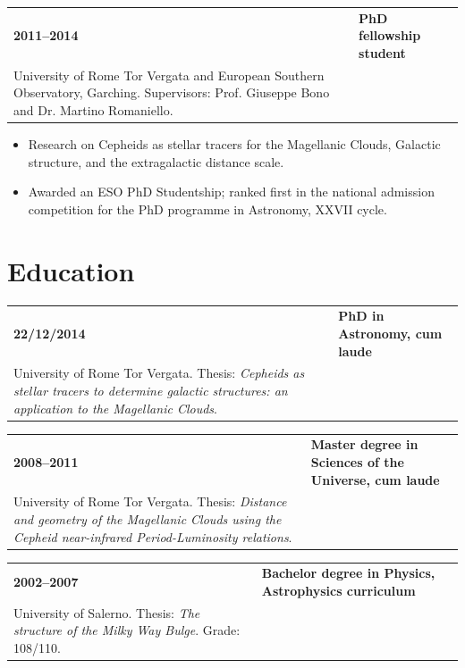 \documentclass[11pt,a4paper]{article}
\makeatletter
\newcommand{\cvitem}[2]{\begin{tabularx}{\textwidth}{@{}p{3.1cm}X@{}}\textbf{#1} & #2 \\ \end{tabularx}}
\newcommand{\role}[3]{\cvitem{#1}{\textbf{#2}\\#3}}
\makeatother
\begin{document}
\role{2011--2014}{PhD fellowship student}{University of Rome Tor Vergata and European Southern Observatory, Garching. Supervisors: Prof. Giuseppe Bono and Dr. Martino Romaniello.}
\begin{itemize}
    \item Research on Cepheids as stellar tracers for the Magellanic Clouds, Galactic structure, and the extragalactic distance scale.
    \item Awarded an ESO PhD Studentship; ranked first in the national admission competition for the PhD programme in Astronomy, XXVII cycle.
\end{itemize}

\section*{Education}
\role{22/12/2014}{PhD in Astronomy, cum laude}{University of Rome Tor Vergata. Thesis: \textit{Cepheids as stellar tracers to determine galactic structures: an application to the Magellanic Clouds}.}
\role{2008--2011}{Master degree in Sciences of the Universe, cum laude}{University of Rome Tor Vergata. Thesis: \textit{Distance and geometry of the Magellanic Clouds using the Cepheid near-infrared Period-Luminosity relations}.}
\role{2002--2007}{Bachelor degree in Physics, Astrophysics curriculum}{University of Salerno. Thesis: \textit{The structure of the Milky Way Bulge}. Grade: 108/110.}
\end{document}
